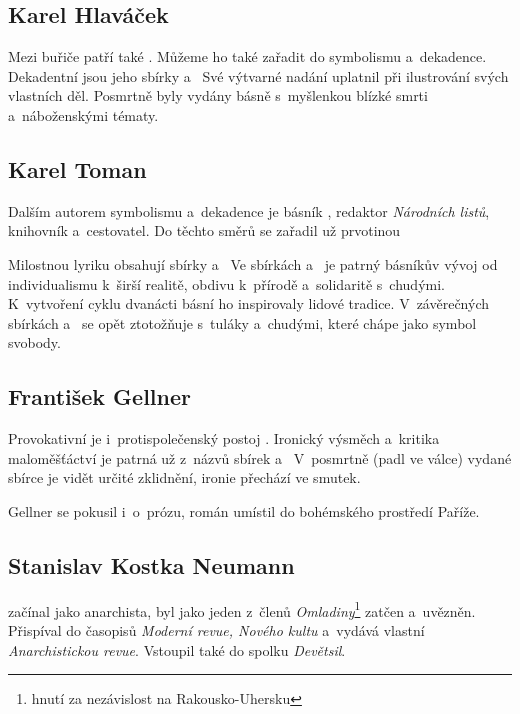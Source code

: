 \subsection*{Karel Hlaváček}
Mezi buřiče patří také . Můžeme ho také zařadit do
symbolismu a~dekadence. Dekadentní jsou jeho sbírky 
a~ Své výtvarné nadání uplatnil při ilustrování svých
vlastních děl. Posmrtně byly vydány  básně s~myšlenkou blízké
smrti a~náboženskými tématy.

\subsection*{Karel Toman}
Dalším autorem symbolismu a~dekadence je básník ,
redaktor \emph{Národních listů}, knihovník a~cestovatel. Do těchto směrů se
zařadil už prvotinou 

Milostnou lyriku obsahují sbírky 
a~ Ve sbírkách 
a~ je patrný básníkův vývoj od individualismu
k~širší realitě, obdivu k~přírodě a~solidaritě s~chudými. K~vytvoření
cyklu dvanácti básní  ho inspirovaly lidové tradice.
V~závěrečných sbírkách  a~ se
opět ztotožňuje s~tuláky a~chudými, které chápe jako symbol svobody.

\subsection*{František Gellner}
Provokativní je i~protispolečenský postoj . Ironický výsměch a~kritika maloměšťáctví
je patrná už z~názvů sbírek 
a~ V~posmrtně (padl ve válce) vydané sbírce
 je vidět určité zklidnění, ironie přechází ve smutek.

Gellner se pokusil i~o~prózu, román  umístil do
bohémského prostředí Paříže.

\subsection*{Stanislav Kostka Neumann}
\label{chap:SKNbur}
 začínal jako anarchista, byl jako jeden
z~členů \emph{Omladiny}\footnote{hnutí za nezávislost na Rakousko-Uhersku} 
zatčen a~uvězněn. Přispíval do časopisů \emph{Moderní revue, Nového kultu}
a~vydává vlastní \emph{Anarchistickou revue}. Vstoupil také do spolku \emph{Devětsil}.

